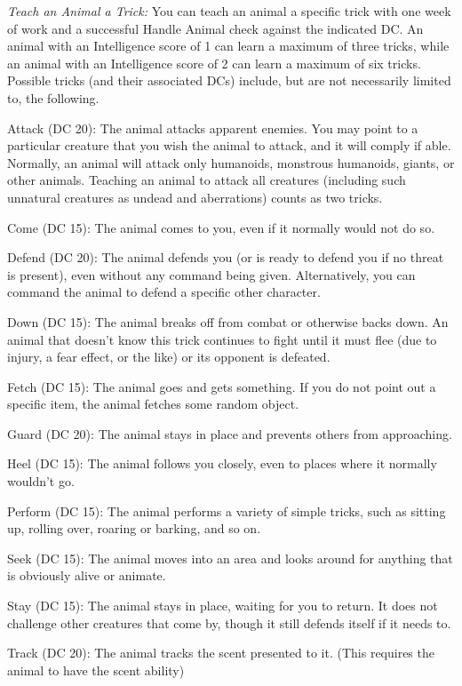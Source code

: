 \textit{Teach an Animal a Trick:} You can teach an animal a specific trick with one week of work and a successful Handle Animal check against the indicated DC. An animal with an Intelligence score of 1 can learn a maximum of three tricks, while an animal with an Intelligence score of 2 can learn a maximum of six tricks. Possible tricks (and their associated DCs) include, but are not necessarily limited to, the following.

{Attack (DC 20):} The animal attacks apparent enemies. You may point to a particular creature that you wish the animal to attack, and it will comply if able. Normally, an animal will attack only humanoids, monstrous humanoids, giants, or other animals. Teaching an animal to attack all creatures (including such unnatural creatures as undead and aberrations) counts as two tricks.

{Come (DC 15):} The animal comes to you, even if it normally would not do so.

{Defend (DC 20):} The animal defends you (or is ready to defend you if no threat is present), even without any command being given. Alternatively, you can command the animal to defend a specific other character.

{Down (DC 15):} The animal breaks off from combat or otherwise backs down. An animal that doesn’t know this trick continues to fight until it must flee (due to injury, a fear effect, or the like) or its opponent is defeated.

{Fetch (DC 15):} The animal goes and gets something. If you do not point out a specific item, the animal fetches some random object.

{Guard (DC 20):} The animal stays in place and prevents others from approaching.

{Heel (DC 15):} The animal follows you closely, even to places where it normally wouldn’t go.

{Perform (DC 15):} The animal performs a variety of simple tricks, such as sitting up, rolling over, roaring or barking, and so on.

{Seek (DC 15):} The animal moves into an area and looks around for anything that is obviously alive or animate.

{Stay (DC 15):} The animal stays in place, waiting for you to return. It does not challenge other creatures that come by, though it still defends itself if it needs to.

{Track (DC 20):} The animal tracks the scent presented to it. (This requires the animal to have the scent ability)


